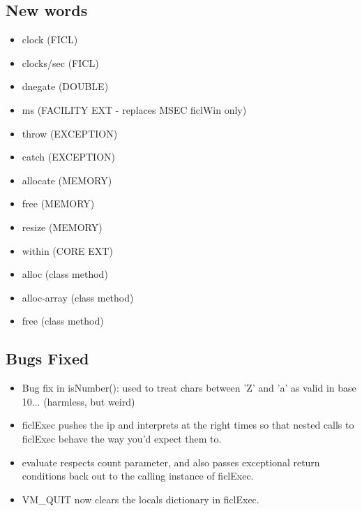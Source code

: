 \subsection*{New words}
\begin{itemize}[noitemsep]
	\item clock              (FICL)
	\item clocks/sec         (FICL)
	\item dnegate            (DOUBLE)
	\item ms                 (FACILITY EXT - replaces MSEC ficlWin only)
	\item throw              (EXCEPTION)
	\item catch              (EXCEPTION)
	\item allocate           (MEMORY)
	\item free               (MEMORY)
	\item resize             (MEMORY)
	\item within             (CORE EXT)
	\item alloc              (class method)
	\item alloc-array        (class method)
	\item free               (class method)
\end{itemize}


\subsection*{Bugs Fixed}
\begin{itemize}[noitemsep]
	\item Bug fix in isNumber(): used to treat chars between 'Z'
	and 'a' as valid in base 10... (harmless, but weird)

	\item ficlExec pushes the ip and interprets at the right times
	so that nested calls to ficlExec behave the way you'd expect
	them to.

	\item evaluate respects count parameter, and also passes
	exceptional return conditions back out to the calling instance
	of ficlExec.

	\item VM\_QUIT now clears the locals dictionary in ficlExec.
\end{itemize}


